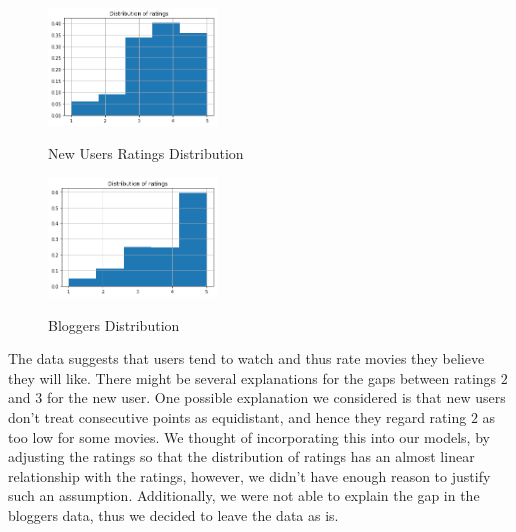 \documentclass[10pt,conference,compsocconf]{IEEEtran}
\begin{document}
\begin{figure}[h!]
    \caption{New Users Ratings Distribution}
    \centering
    \includegraphics[width=0.4\textwidth]{figure2.png}
    \label{fig::new_users}
\end{figure}
\begin{figure}[h!]
    \caption{Bloggers Distribution}
    \centering
    \includegraphics[width=0.4\textwidth]{figure3.png}
    \label{fig::bloggers}
\end{figure}
The data suggests that users tend to watch and thus rate movies they believe they will like. There might be several explanations for the gaps between ratings $2$ and $3$ for the new user. One possible explanation we considered is that new users don't treat consecutive points as equidistant, and hence they regard rating $2$ as too low for some movies. We thought of incorporating this into our models, by adjusting the ratings so that the distribution of ratings has an almost linear relationship with the ratings, however, we didn't have enough reason to justify such an assumption. Additionally, we were not able to explain the gap in the bloggers data, thus we decided to leave the data as is. \vspace{-5pt}
\end{document}
